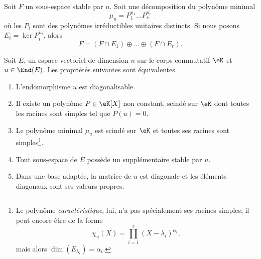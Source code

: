 \begin{lemma}       \label{LemgnaEOk}
    Soit \( F\) un sous-espace stable par \( u\). Soit une décomposition du polynôme minimal
    \begin{equation}
        \mu_u=P_1^{n_1}\ldots P_r^{n_r}
    \end{equation}
    où les \( P_i\) sont des polynômes irréductibles unitaires distincts. Si nous posons \( E_i=\ker P_i^{n_i}\), alors
    \begin{equation}
        F=(F\cap E_1)\oplus\ldots \oplus(F\cap E_r).
    \end{equation}
\end{lemma}

\begin{theorem}     \label{ThoDigLEQEXR}
    Soit \( E\), un espace vectoriel de dimension \( n\) sur le corps commutatif \( \eK\) et \( u\in\End(E)\). Les propriétés suivantes sont équivalentes.
    \begin{enumerate}
        \item\label{ItemThoDigLEQEXRiv}
            L'endomorphisme \( u\) est diagonalisable.
        \item       \label{ItemThoDigLEQEXRi}
            Il existe un polynôme \( P\in\eK[X]\) non constant, scindé sur \(\eK\) dont toutes les racines sont simples tel que \( P(u)=0\).
        \item\label{ItemThoDigLEQEXRii}
            Le polynôme minimal \( \mu_u\) est scindé sur \(\eK\) et toutes ses racines sont simples\footnote{Le polynôme \emph{caractéristique}, lui, n'a pas spécialement ses racines simples; il peut encore être de la forme
            \begin{equation}
                \chi_u(X)=\prod_{i=1}^r(X-\lambda_i)^{\alpha_i},
        \end{equation}
        mais alors \( \dim(E_{\lambda_i})=\alpha_i\). }.
        \item\label{ItemThoDigLEQEXRiii}
            Tout sous-espace de \( E\) possède un supplémentaire stable par \( u\).
        \item       \label{ITEMooZNJFooEiqDYp}
            Dans une base adaptée, la matrice de \( u\) est diagonale et les éléments diagonaux sont ses valeurs propres.
    \end{enumerate}
\end{theorem}

